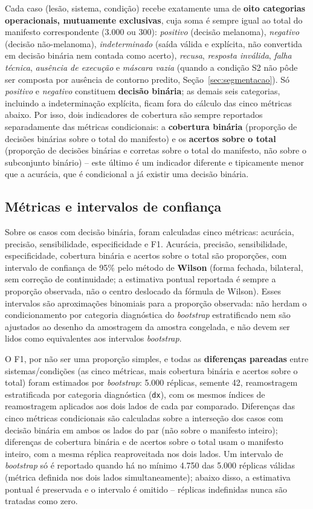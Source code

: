 Cada caso (lesão, sistema, condição) recebe exatamente uma de \textbf{oito categorias operacionais, mutuamente exclusivas}, cuja soma é sempre igual ao total do manifesto correspondente (3.000 ou 300): \textit{positivo} (decisão melanoma), \textit{negativo} (decisão não-melanoma), \textit{indeterminado} (saída válida e explícita, não convertida em decisão binária nem contada como acerto), \textit{recusa}, \textit{resposta inválida}, \textit{falha técnica}, \textit{ausência de execução} e \textit{máscara vazia} (quando a condição S2 não pôde ser composta por ausência de contorno predito, Seção~\ref{sec:segmentacao}). Só \textit{positivo} e \textit{negativo} constituem \textbf{decisão binária}; as demais seis categorias, incluindo a indeterminação explícita, ficam fora do cálculo das cinco métricas abaixo. Por isso, dois indicadores de cobertura são sempre reportados separadamente das métricas condicionais: a \textbf{cobertura binária} (proporção de decisões binárias sobre o total do manifesto) e os \textbf{acertos sobre o total} (proporção de decisões binárias e corretas sobre o total do manifesto, não sobre o subconjunto binário) -- este último é um indicador diferente e tipicamente menor que a acurácia, que é condicional a já existir uma decisão binária.

\subsection{Métricas e intervalos de confiança}

Sobre os casos com decisão binária, foram calculadas cinco métricas: acurácia, precisão, sensibilidade, especificidade e F1. Acurácia, precisão, sensibilidade, especificidade, cobertura binária e acertos sobre o total são proporções, com intervalo de confiança de 95\% pelo método de \textbf{Wilson} (forma fechada, bilateral, sem correção de continuidade; a estimativa pontual reportada é sempre a proporção observada, não o centro deslocado da fórmula de Wilson). Esses intervalos são aproximações binomiais para a proporção observada: não herdam o condicionamento por categoria diagnóstica do \textit{bootstrap} estratificado nem são ajustados ao desenho da amostragem da amostra congelada, e não devem ser lidos como equivalentes aos intervalos \textit{bootstrap}.

O F1, por não ser uma proporção simples, e todas as \textbf{diferenças pareadas} entre sistemas/condições (as cinco métricas, mais cobertura binária e acertos sobre o total) foram estimados por \textit{bootstrap}: 5.000 réplicas, semente 42, reamostragem estratificada por categoria diagnóstica (\texttt{dx}), com os mesmos índices de reamostragem aplicados aos dois lados de cada par comparado. Diferenças das cinco métricas condicionais são calculadas sobre a interseção dos casos com decisão binária em ambos os lados do par (não sobre o manifesto inteiro); diferenças de cobertura binária e de acertos sobre o total usam o manifesto inteiro, com a mesma réplica reaproveitada nos dois lados. Um intervalo de \textit{bootstrap} só é reportado quando há no mínimo 4.750 das 5.000 réplicas válidas (métrica definida nos dois lados simultaneamente); abaixo disso, a estimativa pontual é preservada e o intervalo é omitido -- réplicas indefinidas nunca são tratadas como zero.

